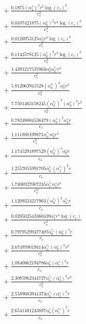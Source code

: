 \documentclass[10pt]{article}
\begin{document}
\begin{align*}
&{}  + \frac{0.1875 \left(\alpha_{1}^s\right)^{2} r^{2} \log{\left(c_{s} \right)}^{2}}{c_{s}^{2}} \\
&{}  + \frac{0.0107421875 \left(\alpha_{0}^s\right)^{2} r^{4} \log{\left(c_{s} \right)}^{2}}{c_{s}^{4}} \\
&{}  + \frac{0.0126953125 \alpha_{2}^s r^{3} \log{\left(c_{s} \right)}^{2}}{c_{s}^{3}} \\
&{}  + \frac{0.1142578125 \left(\alpha_{0}^s\right)^{3} r^{3} \log{\left(c_{s} \right)}^{2}}{c_{s}^{3}} \\
&{}  + \frac{1.4391217537063 \alpha_{0}^s \alpha_{2}^{c_s} r^{2}}{c_{s}^{2}} \\
&{}  + \frac{5.812063941528 \left(\alpha_{0}^{c_s}\right)^{3} \alpha_{0}^s r^{2}}{c_{s}^{2}} \\
&{}  + \frac{7.7501463158245 \left(\alpha_{0}^{c_s}\right)^{2} \left(\alpha_{0}^s\right)^{2} r^{2}}{c_{s}^{2}} \\
&{}  + \frac{0.78248004536479 \left(\alpha_{0}^s\right)^{2} \alpha_{2}^s r}{c_{s}} \\
&{}  + \frac{1.111888199871 \alpha_{0}^{c_s} \alpha_{2}^s r^{2}}{c_{s}^{2}} \\
&{}  + \frac{1.1745291897529 \left(\alpha_{0}^{c_s}\right)^{4} \alpha_{0}^s r}{c_{s}} \\
&{}  + \frac{1.2557055991705 \alpha_{0}^{c_s} \left(\alpha_{1}^{c_s}\right)^{2} r}{c_{s}} \\
&{}  + \frac{1.7406927007245 \alpha_{1}^{c_s} \alpha_{1}^s r^{2}}{c_{s}^{2}} \\
&{}  + \frac{1.1209324217963 \left(\alpha_{0}^{c_s}\right)^{2} \alpha_{2}^{c_s} r}{c_{s}} \\
&{}  + \frac{0.020502543360439 \alpha_{1}^s r^{4} \log{\left(c_{s} \right)}}{c_{s}^{4}} \\
&{}  + \frac{0.79795299477407 \alpha_{0}^{c_s} \left(\alpha_{0}^s\right)^{4} r}{c_{s}} \\
&{}  + \frac{3.674970019414 \alpha_{0}^{c_s} \left(\alpha_{0}^s\right)^{3} r^{2}}{c_{s}^{2}} \\
&{}  + \frac{1.0840862194786 \alpha_{0}^s \left(\alpha_{1}^s\right)^{2} r}{c_{s}} \\
&{}  + \frac{2.3085962344727 \alpha_{0}^{c_s} \left(\alpha_{0}^s\right)^{2} r^{3}}{c_{s}^{3}} \\
&{}  + \frac{2.5589083941373 \alpha_{0}^{c_s} \left(\alpha_{1}^s\right)^{2} r}{c_{s}} \\
&{}  + \frac{2.6541481243887 \alpha_{0}^s \left(\alpha_{1}^{c_s}\right)^{2} r}{c_{s}} \\

\end{align*}
\end{document}

